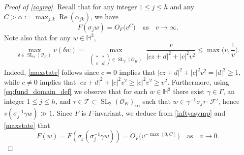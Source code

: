 \documentclass[12pt,reqno]{amsart}
\numberwithin{equation}{section}
\renewcommand{\Re}{\operatorname{Re}}
\DeclareMathOperator{\SL}{SL}
\renewcommand{\pmatrix}[4]{\left(\begin{smallmatrix}#1 & #2 \\ #3 & #4\end{smallmatrix}\right)}
\begin{document}
\begin{proof}[Proof of \cref{zagreg}]
Recall that for any integer $1\leq j\leq h$ and any $C>\alpha:=\max_{j,k}  \Re(\alpha_{jk})$, we have
\begin{equation} \label{inftyasymp}
    F(\sigma_{j} w) = O_F\big(v^{C}\big) \quad \text{as} \quad v \to \infty.
\end{equation} 
Note also that for any $w \in \mathbb{H}^3$,
\begin{equation} \label{maxstate}
    \max_{\delta \in \SL_2(\mathcal{O}_K)} v(\delta w)=\max_{\substack{\pmatrix {*} {*} {c} {d} \in \SL_2(\mathcal{O}_K)}} \frac{v}{|cz+d|^2+|c|^2 v^2} \leq \max \Big (v,\frac{1}{v}  \Big ).
\end{equation}
Indeed, \eqref{maxstate} follows since $c=0$ implies that $|c z+d|^2+|c|^2 v^2 = |d|^2 \geq 1$, while $c \neq 0$ implies that $|c z+d|^2+|c|^2 v^2 \geq |c|^2 v^2 \geq v^2$. Furthermore, using \eqref{eq:fund_domain_def} we observe that for each $w \in \mathbb{H}^3$ there exist $\gamma\in \Gamma$, an integer $1\leq j \leq h$, and $\tau \in \mathcal{T} \subset \SL_2(\mathcal{O}_K)_\infty$ such that $w \in \gamma^{-1} \sigma_j \tau \cdot \mathcal{F}'$, hence $v(\sigma_j^{-1} \gamma w) \gg 1$. Since $F$ is $\Gamma$-invariant, we deduce from \eqref{inftyasymp} and \eqref{maxstate} that 
\begin{equation} \label{zeroasymp}
    F(w) = F(\sigma_j (\sigma_j^{-1}\gamma w)) =  O_F\big(v^{-\max(0, C)}\big) \quad \text{as} \quad v \to 0. 
\end{equation}


\end{proof}
\end{document}
